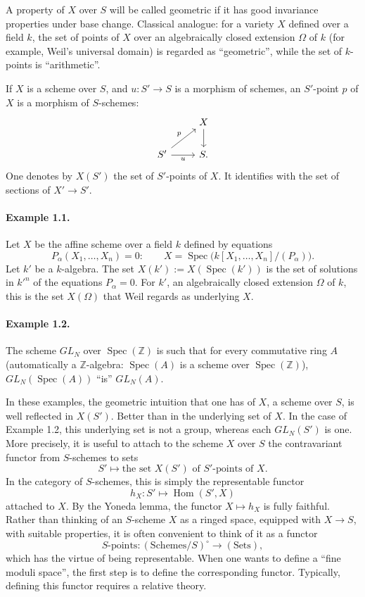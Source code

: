 \documentclass[11pt]{article}
\begin{document}
A property of \(X\) over \(S\) will be called geometric if it has good invariance properties under base change. Classical analogue: for a variety \(X\) defined over a field \(k\), the set of points of \(X\) over an algebraically closed extension \(\Omega\) of \(k\) (for example, Weil's universal domain) is regarded as ``geometric'', while the set of \(k\)-points is ``arithmetic''.

If \(X\) is a scheme over \(S\), and \(u:S'\to S\) is a morphism of schemes, an \(S'\)-point \(p\) of \(X\) is a morphism of \(S\)-schemes:
\[
\begin{tikzcd}
 & X \arrow[d]\\
S' \arrow[ur,"p"] \arrow[r,"u"'] & S .
\end{tikzcd}
\]
One denotes by \(X(S')\) the set of \(S'\)-points of \(X\). It identifies with the set of sections of \(X'\to S'\).

\paragraph{Example 1.1.}
Let \(X\) be the affine scheme over a field \(k\) defined by equations
\[
  P_\alpha(X_1,\ldots,X_n)=0:
  \qquad
  X=\operatorname{Spec}\bigl(k[X_1,\ldots,X_n]/(P_\alpha)\bigr).
\]
Let \(k'\) be a \(k\)-algebra. The set \(X(k'):=X(\operatorname{Spec}(k'))\) is the set of solutions in \(k'^n\) of the equations \(P_\alpha=0\). For \(k'\), an algebraically closed extension \(\Omega\) of \(k\), this is the set \(X(\Omega)\) that Weil regards as underlying \(X\).

\paragraph{Example 1.2.}
The scheme \(GL_N\) over \(\operatorname{Spec}(\mathbb Z)\) is such that for every commutative ring \(A\) (automatically a \(\mathbb Z\)-algebra: \(\operatorname{Spec}(A)\) is a scheme over \(\operatorname{Spec}(\mathbb Z)\)), \(GL_N(\operatorname{Spec}(A))\) ``is'' \(GL_N(A)\).

In these examples, the geometric intuition that one has of \(X\), a scheme over \(S\), is well reflected in \(X(S')\). Better than in the underlying set of \(X\). In the case of Example 1.2, this underlying set is not a group, whereas each \(GL_N(S')\) is one. More precisely, it is useful to attach to the scheme \(X\) over \(S\) the contravariant functor from \(S\)-schemes to sets
\[
  S' \longmapsto \text{the set } X(S') \text{ of } S'\text{-points of } X.
\]
In the category of \(S\)-schemes, this is simply the representable functor
\[
  h_X:S'\longmapsto \operatorname{Hom}(S',X)
\]
attached to \(X\). By the Yoneda lemma, the functor \(X\mapsto h_X\) is fully faithful. Rather than thinking of an \(S\)-scheme \(X\) as a ringed space, equipped with \(X\to S\), with suitable properties, it is often convenient to think of it as a functor
\[
  \text{\(S\)-points}:(\text{Schemes}/S)^\circ\longrightarrow(\text{Sets}),
\]
which has the virtue of being representable. When one wants to define a ``fine moduli space'', the first step is to define the corresponding functor. Typically, defining this functor requires a relative theory.
\end{document}
